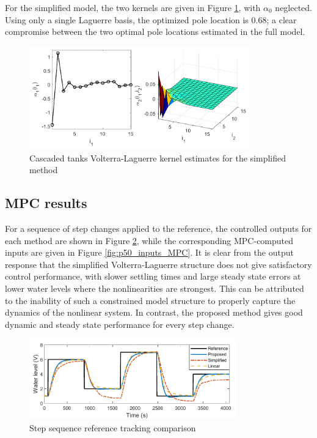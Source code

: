 For the simplified model, the two kernels are given in Figure \ref{fig:SimplifiedKernels_MPC}, with $\alpha_0$ neglected. Using only a single Laguerre basis, the optimized pole location is $0.68$; a clear compromise between the two optimal pole locations estimated in the full model.

\begin{figure}[h]
\centering
\includegraphics[width=0.85\textwidth]{Chapter11_ControlStudy/Simple_kernels_coloured.pdf}
\caption{Cascaded tanks Volterra-Laguerre kernel estimates for the simplified method}
\label{fig:SimplifiedKernels_MPC}
\end{figure}

\subsection{MPC results}

For a sequence of step changes applied to the reference, the controlled outputs for each method are shown in Figure \ref{fig:p50_comparison_MPC}, while the corresponding MPC-computed inputs are given in Figure \ref{fig:p50_inputs_MPC}. It is clear from the output response that the simplified Volterra-Laguerre structure does not give satisfactory control performance, with slower settling times and large steady state errors at lower water levels where the nonlinearities are strongest. This can be attributed to the inability of such a constrained model structure to properly capture the dynamics of the nonlinear system. In contrast, the proposed method gives good dynamic and steady state performance for every step change. 

\begin{figure}[h]
\centering
\includegraphics[width=0.8\textwidth]{Chapter11_ControlStudy/p50_equalPenalty_outputs.pdf}
\caption{Step sequence reference tracking comparison}
\label{fig:p50_comparison_MPC}
\end{figure}

